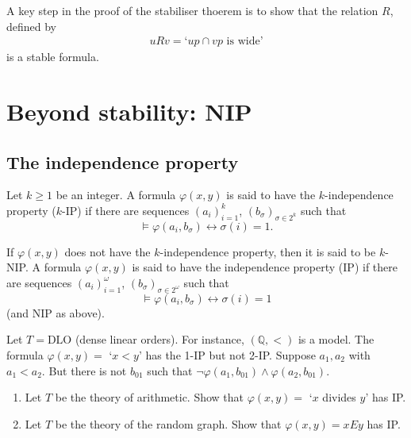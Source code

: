 \documentclass{article}
\let\models\vDash
\begin{document}
A key step in the proof of the stabiliser thoerem is to show that the relation $R$, defined by
\begin{align*}
  u R v = \text{`}u p \cap v p\text{ is wide'}
\end{align*}
is a stable formula.

\clearpage
\section{Beyond stability: NIP}
\subsection{The independence property}
\begin{defi}
  Let $k \geq 1$ be an integer. A formula $\varphi(x,y)$ is said to have the $k$-independence property ($k$-IP) if there are sequences $(a_i)_{i=1}^k$, $(b_\sigma)_{\sigma\in2^k}$ such that
  \begin{equation*}
    \models \varphi(a_i, b_\sigma) \leftrightarrow \sigma(i) = 1.
  \end{equation*}

  If $\varphi(x,y)$ does not have the $k$-independence property, then it is said to be $k$-NIP.
  A formula $\varphi(x,y)$ is said to have the independence property (IP) if there are sequences $(a_i)_{i=1}^\omega$, $(b_\sigma)_{\sigma \in 2^\omega}$ such that
  \begin{equation*}
    \models \varphi(a_i, b_\sigma) \leftrightarrow \sigma(i) = 1
  \end{equation*}
  (and NIP as above).
\end{defi}
\begin{eg}
  Let $T = \text{DLO}$ (dense linear orders). For instance, $(\mathbb{Q},<)$ is a model.
  The formula $\varphi(x,y) =$ `$x<y$' has the 1-IP but not 2-IP. Suppose $a_1, a_2$ with $a_1 < a_2$. But there is not $b_{01}$ such that $\neg \varphi(a_1, b_{01}) \land \varphi(a_2, b_{01})$.
\end{eg}
\begin{ex}
  \leavevmode
  \begin{enumerate}[label=(\alph*)]
    \item Let $T$ be the theory of arithmetic. Show that $\varphi(x,y) = $ `$x$ divides $y$' has IP.
    \item Let $T$ be the theory of the random graph. Show that $\varphi(x,y) = xEy$ has IP.
  \end{enumerate}
\end{ex}
\end{document}
